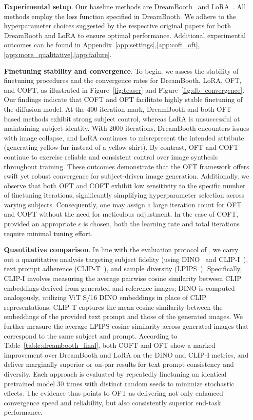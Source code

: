 \textbf{Experimental setup}. Our baseline methods are DreamBooth~\cite{ruiz2023dreambooth} and LoRA~\cite{hulora2022}. All methods employ the loss function specified in DreamBooth. We adhere to the hyperparameter choices suggested by the respective original papers for both DreamBooth and LoRA to ensure optimal performance. Additional experimental outcomes can be found in Appendix~\ref{app:settings},\ref{app:coft_oft},\ref{app:more_qualitative},\ref{app:failure}.

\textbf{Finetuning stability and convergence}. To begin, we assess the stability of finetuning procedures and the convergence rates for DreamBooth, LoRA, OFT, and COFT, as illustrated in Figure~\ref{fig:teaser} and Figure~\ref{fig:db_convergence}. Our findings indicate that COFT and OFT facilitate highly stable finetuning of the diffusion model. At the 400-iteration mark, DreamBooth and both OFT-based methods exhibit strong subject control, whereas LoRA is unsuccessful at maintaining subject identity. With 2000 iterations, DreamBooth encounters issues with image collapse, and LoRA continues to misrepresent the intended attribute (generating yellow fur instead of a yellow shirt). By contrast, OFT and COFT continue to exercise reliable and consistent control over image synthesis throughout training. These outcomes demonstrate that the OFT framework offers swift yet robust convergence for subject-driven image generation. Additionally, we observe that both OFT and COFT exhibit low sensitivity to the specific number of finetuning iterations, significantly simplifying hyperparameter selection across varying subjects. Consequently, one may assign a large iteration count for OFT and COFT without the need for meticulous adjustment. In the case of COFT, provided an appropriate $\epsilon$ is chosen, both the learning rate and total iterations require minimal tuning effort.

\textbf{Quantitative comparison}. In line with the evaluation protocol of \cite{ruiz2023dreambooth}, we carry out a quantitative analysis targeting subject fidelity (using DINO~\cite{caron2021emerging} and CLIP-I~\cite{radford2021learning}), text prompt adherence (CLIP-T~\cite{radford2021learning}), and sample diversity (LPIPS~\cite{zhang2018unreasonable}). Specifically, CLIP-I involves measuring the average pairwise cosine similarity between CLIP embeddings derived from generated and reference images; DINO is computed analogously, utilizing ViT S/16 DINO embeddings in place of CLIP representations. CLIP-T captures the mean cosine similarity between the embeddings of the provided text prompt and those of the generated images. We further measure the average LPIPS cosine similarity across generated images that correspond to the same subject and prompt. According to Table~\ref{table:dreambooth_final}, both COFT and OFT show a marked improvement over DreamBooth and LoRA on the DINO and CLIP-I metrics, and deliver marginally superior or on-par results for text prompt consistency and diversity. Each approach is evaluated by repeatedly finetuning an identical pretrained model 30 times with distinct random seeds to minimize stochastic effects. The evidence thus points to OFT as delivering not only enhanced convergence speed and reliability, but also consistently superior end-task performance.


